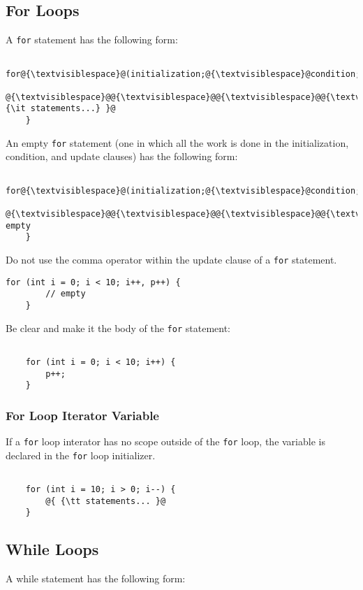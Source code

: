 \documentclass[fleqn,12pt]{PARCOneColumn} %
\begin{document}
\subsection{For Loops}
A {\tt for} statement has the following form:

\begin{lstlisting}
    for@{\textvisiblespace}@(initialization;@{\textvisiblespace}@condition;@{\textvisiblespace}@update)@{\textvisiblespace}@{
    @{\textvisiblespace}@@{\textvisiblespace}@@{\textvisiblespace}@@{\textvisiblespace}@@{ {\it statements...} }@
    }
\end{lstlisting}

An empty {\tt for}  statement (one in which all the work is done in the initialization, condition, and update clauses)
has the following form:

\begin{lstlisting}
    for@{\textvisiblespace}@(initialization;@{\textvisiblespace}@condition;@{\textvisiblespace}@update)@{\textvisiblespace}@{
    @{\textvisiblespace}@@{\textvisiblespace}@@{\textvisiblespace}@@{\textvisiblespace}@// empty
    }
\end{lstlisting}

Do not use the comma operator within the update clause of a {\tt for} statement.

\begin{lstlisting}[backgroundcolor=\color{badCodeColor}]
    for (int i = 0; i < 10; i++, p++) {
        // empty
    }
\end{lstlisting}

Be clear and make it the body of the {\tt for} statement:

\begin{lstlisting}

    for (int i = 0; i < 10; i++) {
        p++;
    }

\end{lstlisting}

\subsubsection{For Loop Iterator Variable}

If a {\tt for}  loop interator has no scope outside of the {\tt for} loop, the variable is declared in the {\tt for} loop initializer.
\begin{lstlisting}

	for (int i = 10; i > 0; i--) {
		@{ {\tt statements... }@
	}
\end{lstlisting}
\subsection{While Loops}
A while statement has the following form:
\end{document}
